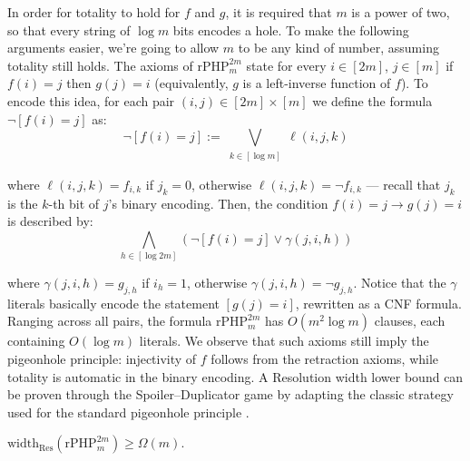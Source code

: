 In order for totality to hold for $f$ and $g$, it is required that $m$ is a power of two, so that every string of $\log m$ bits encodes a hole. To make the following arguments easier, we're going to allow $m$ to be any kind of number, assuming totality still holds. The axioms of $\mathrm{rPHP}^{2m}_m$ state for every $i \in [2m]$, $j \in [m]$ if $f(i) = j$ then $g(j) = i$ (equivalently, $g$ is a left-inverse function of $f$). To encode this idea, for each pair $(i,j) \in [2m] \times [m]$ we define the formula $\lnot[f(i) = j]$ as:
\begin{equation}
    \lnot[f(i) = j] := \bigvee_{\substack{k \in [\log m]}} \ell(i,j,k)
\end{equation}

where $\ell(i,j,k) = f_{i,k}$ if $j_k = 0$, otherwise $\ell(i,j,k) = \lnot f_{i,k}$ --- recall that $j_k$ is the $k$-th bit of $j$'s binary encoding. Then, the condition $f(i) = j \to g(j) = i$ is described by:
\begin{equation}
    \bigwedge_{h \in [\log 2m] } (\lnot[f(i) = j] \lor \gamma(j,i,h))
\end{equation}

where $\gamma(j,i,h) = g_{j, h}$ if $i_h = 1$, otherwise $\gamma(j,i,h) = \lnot g_{j,h}$. Notice that the $\gamma$ literals basically encode the statement $[g(j) = i]$, rewritten as a CNF formula. Ranging across all pairs, the formula $\mathrm{rPHP}^{2m}_m$ has $O(m^2\log m)$ clauses, each containing $O(\log m)$ literals. We observe that such axioms still imply the pigeonhole principle: injectivity of $f$ follows from the retraction axioms, while totality is automatic in the binary encoding. A Resolution width lower bound can be proven through the Spoiler--Duplicator game by adapting the classic strategy used for the standard pigeonhole principle \cite{rphp_2, atserias_dalmau}.

\begin{lemma}
    \label{lem:rPHP_lower_bound}
    $\mathrm{width}_{\mathrm{Res}}(\mathrm{rPHP}^{2m}_m) \geq \Omega(m)$.
\end{lemma}

